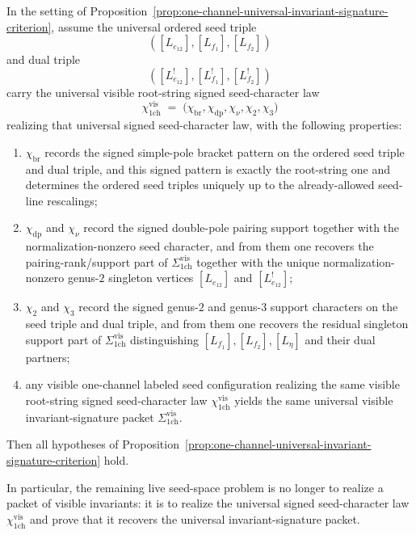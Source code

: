 \begin{proposition}\label{prop:one-channel-signed-seed-character-criterion}
In the setting of
Proposition~\textup{\ref{prop:one-channel-universal-invariant-signature-criterion}},
assume the universal ordered seed triple
\[
([L_{e_{12}}],[L_{f_1}],[L_{f_2}])
\]
and dual triple
\[
([L_{e_{12}}^!],[L_{f_1}^!],[L_{f_2}^!])
\]
carry the universal visible root-string signed seed-character law
\[
\chi_{\mathrm{1ch}}^{\mathrm{vis}}
\;=\;
\bigl(
\chi_{\mathrm{br}},
\chi_{\mathrm{dp}},
\chi_{\nu},
\chi_2,
\chi_3
\bigr)
\]
realizing that universal signed seed-character law, with the following
properties:
\begin{enumerate}[label=\textup{(\roman*)}]
\item $\chi_{\mathrm{br}}$ records the signed simple-pole bracket
  pattern on the ordered seed triple and dual triple, and this signed
  pattern is exactly the root-string one and determines the ordered
  seed triples uniquely up to the already-allowed seed-line rescalings;
\item $\chi_{\mathrm{dp}}$ and $\chi_{\nu}$ record the signed
  double-pole pairing support together with the normalization-nonzero
  seed character, and from them one recovers the pairing-rank/support
  part of
  $\Sigma_{\mathrm{1ch}}^{\mathrm{vis}}$
  together with the unique normalization-nonzero genus-$2$ singleton
  vertices
  $[L_{e_{12}}]$ and $[L_{e_{12}}^!]$;
\item $\chi_2$ and $\chi_3$ record the signed genus-$2$ and genus-$3$
  support characters on the seed triple and dual triple, and from them
  one recovers the residual singleton support part of
  $\Sigma_{\mathrm{1ch}}^{\mathrm{vis}}$ distinguishing
  $[L_{f_1}], [L_{f_2}], [L_{\eta}]$ and their dual partners;
\item any visible one-channel labeled seed configuration realizing the
  same visible root-string signed seed-character law
  $\chi_{\mathrm{1ch}}^{\mathrm{vis}}$
  yields the same universal visible invariant-signature packet
  $\Sigma_{\mathrm{1ch}}^{\mathrm{vis}}$.
\end{enumerate}
Then all hypotheses of
Proposition~\ref{prop:one-channel-universal-invariant-signature-criterion}
hold.

In particular, the remaining live seed-space problem is no longer to
realize a packet of visible invariants: it is to realize the universal
signed seed-character law
$\chi_{\mathrm{1ch}}^{\mathrm{vis}}$
and prove that it recovers the universal invariant-signature packet.
\end{proposition}

